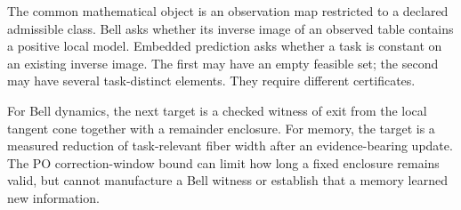 \documentclass[
]{article}
\begin{document}
The common mathematical object is an observation map restricted to a declared admissible class. Bell asks whether its inverse image of an observed table contains a positive local model. Embedded prediction asks whether a task is constant on an existing inverse image. The first may have an empty feasible set; the second may have several task-distinct elements. They require different certificates.

For Bell dynamics, the next target is a checked witness of exit from the local tangent cone together with a remainder enclosure. For memory, the target is a measured reduction of task-relevant fiber width after an evidence-bearing update. The PO correction-window bound can limit how long a fixed enclosure remains valid, but cannot manufacture a Bell witness or establish that a memory learned new information.
\end{document}
